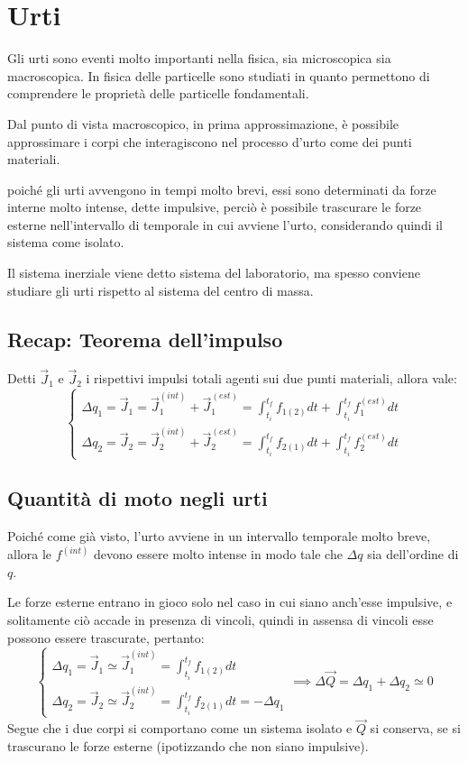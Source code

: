 \documentclass[11pt, a4paper, openright]{book}
\theoremstyle{plain}
\theoremstyle{definition}
\begin{document}
\section{Urti}
Gli urti sono eventi molto importanti nella fisica, sia microscopica sia macroscopica. In fisica delle particelle sono studiati in quanto permettono di comprendere le proprietà delle particelle fondamentali.

Dal punto di vista macroscopico, in prima approssimazione, è possibile approssimare i corpi che interagiscono nel processo d'urto come dei punti materiali.

poiché gli urti avvengono in tempi molto brevi, essi sono determinati da forze interne molto intense, dette impulsive, perciò è possibile trascurare le forze esterne nell'intervallo di temporale in cui avviene l'urto, considerando quindi il sistema come isolato.

Il sistema inerziale viene detto sistema del laboratorio, ma spesso conviene studiare gli urti rispetto al sistema del centro di massa.

\subsection{Recap: Teorema dell'impulso}
Detti $\vec{J}_1$ e $\vec{J}_2$ i rispettivi impulsi totali agenti sui due punti materiali, allora vale:
\begin{equation}
    \begin{cases}
        \displaystyle \Delta q_1 = \vec{J}_1 = \vec{J}_1^{(int)} + \vec{J}_1^{(est)} = \int_{t_i}^{t_f} f_{1(2)} dt + \int_{t_i}^{t_f} f_1^{(est)}dt \\[2em]
        \displaystyle \Delta q_2 = \vec{J}_2 = \vec{J}_2^{(int)} + \vec{J}_2^{(est)} = \int_{t_i}^{t_f} f_{2(1)} dt + \int_{t_i}^{t_f} f_2^{(est)}dt
    \end{cases}
\end{equation}

\subsection{Quantità di moto negli urti}
Poiché come già visto, l'urto avviene in un intervallo temporale molto breve, allora le $f^{(int)}$ devono essere molto intense in modo tale che $\Delta q$ sia dell'ordine di $q$.

Le forze esterne entrano in gioco solo nel caso in cui siano anch'esse impulsive, e solitamente ciò accade in presenza di vincoli, quindi in assensa di vincoli esse possono essere trascurate, pertanto:
\begin{equation}
    \begin{cases}
        \displaystyle \Delta q_1 = \vec{J}_1 \simeq \vec{J}_1^{(int)} = \int_{t_i}^{t_f} f_{1(2)} dt \\[2em]
        \displaystyle \Delta q_2 = \vec{J}_2 \simeq \vec{J}_2^{(int)} = \int_{t_i}^{t_f} f_{2(1)} dt = - \Delta q_1
    \end{cases} \implies \Delta \vec{Q} = \Delta q_1 + \Delta q_2 \simeq 0
\end{equation}
Segue che i due corpi si comportano come un sistema isolato e $\vec{Q}$ si conserva, se si trascurano le forze esterne (ipotizzando che non siano impulsive).
\end{document}
